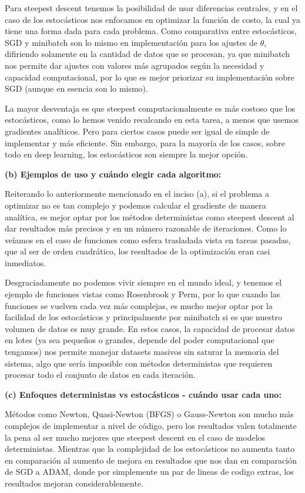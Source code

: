 \documentclass{article}
\begin{document}
Para steepest descent tenemos la posibilidad de usar diferencias centrales, y en el caso de los estocásticos nos enfocamos en optimizar la función de costo, la cual ya tiene una forma dada para cada problema. Como comparativa entre estocásticos, SGD y minibatch son lo mismo en implementación para los ajustes de $\theta$, difiriendo solamente en la cantidad de datos que se procesan, ya que minibatch nos permite dar ajustes con valores más agrupados según la necesidad y capacidad computacional, por lo que es mejor priorizar su implementación sobre SGD (aunque en esencia son lo mismo).

La mayor desventaja es que steepest computacionalmente es más costoso que los estocásticos, como lo hemos venido recalcando en esta tarea, a menos que usemos gradientes analíticos. Pero para ciertos casos puede ser igual de simple de implementar y más eficiente. Sin embargo, para la mayoría de los casos, sobre todo en deep learning, los estocásticos son siempre la mejor opción.

\textbf{(b) Ejemplos de uso y cuándo elegir cada algoritmo:}

Reiterando lo anteriormente mencionado en el inciso (a), si el problema a optimizar no es tan complejo y podemos calcular el gradiente de manera analítica, es mejor optar por los métodos deterministas como steepest descent al dar resultados más precisos y en un número razonable de iteraciones. Como lo veíamos en el caso de funciones como esfera trasladada vista en tareas pasadas, que al ser de orden cuadrático, los resultados de la optimización eran casi inmediatos.

Desgraciadamente no podemos vivir siempre en el mundo ideal, y tenemos el ejemplo de funciones vistas como Rosenbrook y Perm, por lo que cuando las funciones se vuelven cada vez más complejas, es mucho mejor optar por la facilidad de los estocásticos y principalmente por minibatch si es que nuestro volumen de datos es muy grande. En estos casos, la capacidad de procesar datos en lotes (ya sea pequeños o grandes, depende del poder computacional que tengamos) nos permite manejar datasets masivos sin saturar la memoria del sistema, algo que sería imposible con métodos deterministas que requieren procesar todo el conjunto de datos en cada iteración.

\textbf{(c) Enfoques deterministas vs estocásticos - cuándo usar cada uno:}

Métodos como Newton, Quasi-Newton (BFGS) o Gauss-Newton son mucho más complejos de implementar a nivel de código, pero los resultados valen totalmente la pena al ser mucho mejores que steepest descent en el caso de modelos deterministas. Mientras que la complejidad de los estocásticos no aumenta tanto en comparación al aumento de mejora en resultados que nos dan en comparación de SGD a ADAM, donde por simplemente un par de lineas de codigo extras, los resultados mejoran considerablemente.
\end{document}
